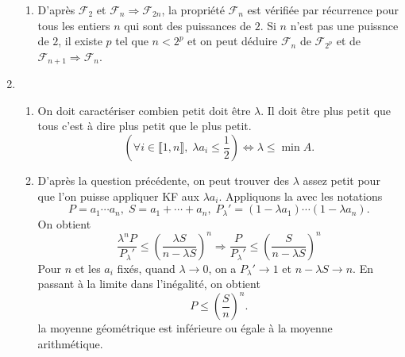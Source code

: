 \begin{enumerate}
\begin{enumerate}
 \item D'après $\mathcal{F}_2$ et $\mathcal{F}_n \Rightarrow \mathcal{F}_{2n}$, la propriété $\mathcal{F}_n$ est vérifiée par récurrence pour tous les entiers $n$ qui sont des puissances de $2$. Si $n$ n'est pas une puissnce de $2$, il existe $p$ tel que $n < 2^p$ et on peut déduire $\mathcal{F}_n$ de $\mathcal{F}_{2^p}$ et de $\mathcal{F}_{n+1}\Rightarrow \mathcal{F}_{n}$. 
\end{enumerate}

 
 \item
\begin{enumerate}
 \item On doit caractériser \og combien petit doit être $\lambda$\fg. Il doit être plus petit que tous c'est à dire plus petit que le plus petit.
\[
 \left( \forall i \in \llbracket 1,n \rrbracket, \; \lambda a_i \leq \frac{1}{2}\right) 
 \Leftrightarrow \lambda \leq \min A.
\]

 \item D'après la question précédente, on peut trouver des $\lambda$ assez petit pour que l'on puisse appliquer KF aux $\lambda a_i$. Appliquons la avec les notations 
\[
P = a_1 \cdots a_n,\;  S = a_1 + \cdots + a_n,\;  P_\lambda' = (1-\lambda a_1)\cdots(1-\lambda a_n).
\]
On obtient
\[
 \frac{\lambda^n P}{P_\lambda'} \leq \left( \frac{\lambda S}{n - \lambda S} \right)^n 
 \Rightarrow 
 \frac{P}{P_\lambda'} \leq \left( \frac{ S}{n - \lambda S} \right)^n 
\]
Pour $n$ et les $a_i$ fixés, quand $\lambda \rightarrow 0$, on a $P_\lambda' \rightarrow 1$ et $n - \lambda S \rightarrow n$. En passant à la limite dans l'inégalité, on obtient
\[
 P \leq \left( \frac{S}{n}\right)^n .
\]
la moyenne géométrique est inférieure ou égale à la moyenne arithmétique.
\end{enumerate}

\end{enumerate}
